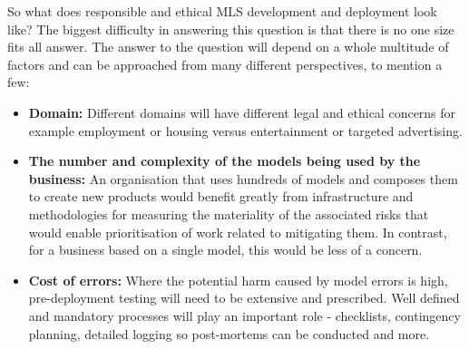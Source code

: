 So what does responsible and ethical MLS development and deployment look like? The biggest difficulty in answering this question is that there is no one size fits all answer. The answer to the question will depend on a whole multitude of factors and can be approached from many different perspectives, to mention a few:
%
\begin{itemize}[leftmargin=*]
%
\item \textbf{Domain:} Different domains will have different legal and ethical concerns for example employment or housing versus entertainment or targeted advertising.
%
\item \textbf{The number and complexity of the models being used by the business:} An organisation that uses hundreds of models and composes them to create new products would benefit greatly from infrastructure and methodologies for measuring the materiality of the associated risks that would enable prioritisation of work related to mitigating them. In contrast, for a business based on a single model, this would be less of a concern.
%
\item \textbf{Cost of errors:} Where the potential harm caused by model errors is high, pre-deployment testing will need to be extensive and prescribed. Well defined and mandatory processes will play an important role - checklists, contingency planning, detailed logging so post-mortems can be conducted and more.
%
\end{itemize}

